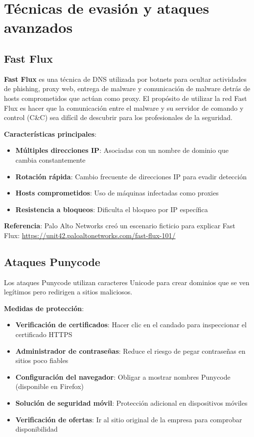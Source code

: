 \section{Técnicas de evasión y ataques avanzados}

\subsection{Fast Flux}

\textbf{Fast Flux} es una técnica de DNS utilizada por botnets para ocultar actividades de phishing, proxy web, entrega de malware y comunicación de malware detrás de hosts comprometidos que actúan como proxy. El propósito de utilizar la red Fast Flux es hacer que la comunicación entre el malware y su servidor de comando y control (C\&C) sea difícil de descubrir para los profesionales de la seguridad.

\textbf{Características principales}:
\begin{itemize}
    \item \textbf{Múltiples direcciones IP}: Asociadas con un nombre de dominio que cambia constantemente
    \item \textbf{Rotación rápida}: Cambio frecuente de direcciones IP para evadir detección
    \item \textbf{Hosts comprometidos}: Uso de máquinas infectadas como proxies
    \item \textbf{Resistencia a bloqueos}: Dificulta el bloqueo por IP específica
\end{itemize}

\textbf{Referencia}: Palo Alto Networks creó un escenario ficticio para explicar Fast Flux: \url{https://unit42.paloaltonetworks.com/fast-flux-101/}

\subsection{Ataques Punycode}

Los ataques Punycode utilizan caracteres Unicode para crear dominios que se ven legítimos pero redirigen a sitios maliciosos.

\textbf{Medidas de protección}:
\begin{itemize}
    \item \textbf{Verificación de certificados}: Hacer clic en el candado para inspeccionar el certificado HTTPS
    \item \textbf{Administrador de contraseñas}: Reduce el riesgo de pegar contraseñas en sitios poco fiables
    \item \textbf{Configuración del navegador}: Obligar a mostrar nombres Punycode (disponible en Firefox)
    \item \textbf{Solución de seguridad móvil}: Protección adicional en dispositivos móviles
    \item \textbf{Verificación de ofertas}: Ir al sitio original de la empresa para comprobar disponibilidad
\end{itemize}

